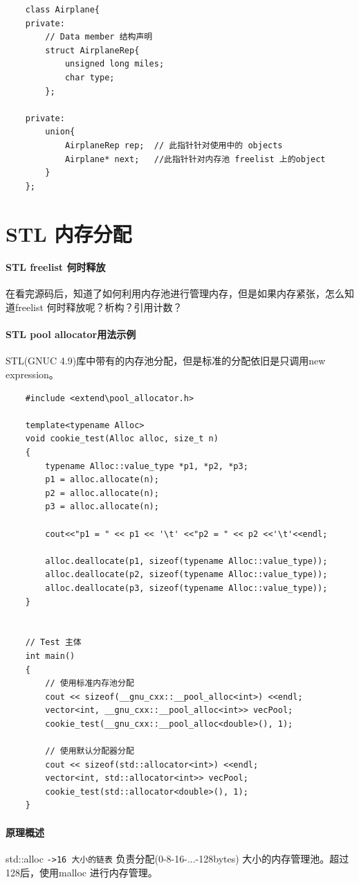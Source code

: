 \documentclass[UTF8,a4paper,12pt]{ctexbook}
\begin{document}
			\begin{lstlisting}
	class Airplane{
	private:
		// Data member 结构声明
		struct AirplaneRep{
			unsigned long miles;
			char type;
		};
		
	private:
		union{
			AirplaneRep rep;  // 此指针针对使用中的 objects
			Airplane* next;   //此指针针对内存池 freelist 上的object 
		}
	};
			\end{lstlisting}
	
	
	\section{STL 内存分配}
		\paragraph{STL freelist 何时释放}
			在看完源码后，知道了如何利用内存池进行管理内存，但是如果内存紧张，怎么知道freelist 何时释放呢？析构？引用计数？
			
		\paragraph{STL pool allocator用法示例}
			STL(GNUC 4.9)库中带有的内存池分配，但是标准的分配依旧是只调用new expression。
			
			\begin{lstlisting}
	#include <extend\pool_allocator.h>
	
	template<typename Alloc>
	void cookie_test(Alloc alloc, size_t n)
	{
		typename Alloc::value_type *p1, *p2, *p3;
		p1 = alloc.allocate(n);
		p2 = alloc.allocate(n);
		p3 = alloc.allocate(n);
		
		cout<<"p1 = " << p1 << '\t' <<"p2 = " << p2 <<'\t'<<endl;
		
		alloc.deallocate(p1, sizeof(typename Alloc::value_type));
		alloc.deallocate(p2, sizeof(typename Alloc::value_type));
		alloc.deallocate(p3, sizeof(typename Alloc::value_type));
	}
	
	
	// Test 主体
	int main()
	{
		// 使用标准内存池分配
		cout << sizeof(__gnu_cxx::__pool_alloc<int>) <<endl;
		vector<int, __gnu_cxx::__pool_alloc<int>> vecPool;
		cookie_test(__gnu_cxx::__pool_alloc<double>(), 1);
		
		// 使用默认分配器分配
		cout << sizeof(std::allocator<int>) <<endl;
		vector<int, std::allocator<int>> vecPool;
		cookie_test(std::allocator<double>(), 1);		
	}
			\end{lstlisting}
		
		
		\paragraph{原理概述}
			std::alloc \verb|->16 大小的链表| 负责分配(0-8-16-...-128bytes) 大小的内存管理池。超过128后，使用malloc 进行内存管理。
			
\end{document}
